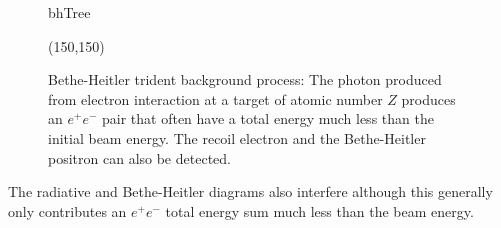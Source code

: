 \begin{figure}[htb]
    \begin{center}
	\begin{fmffile}{bhTree}
	\begin{fmfgraph*}(150,150)
	\fmfstraight
		\fmffreeze
		\fmffreeze	
	\end{fmfgraph*}
	\end{fmffile}
  	\end{center}
    	\caption[Bethe-Heitler background]{Bethe-Heitler trident background process: The photon produced from electron interaction at a target of atomic number $Z$ produces an $e^+e^-$ pair that often have a total energy much less than the initial beam energy. The recoil electron and the Bethe-Heitler positron can also be detected.}
   	 \label{fig:bhTree}	
\end{figure}

The radiative and Bethe-Heitler diagrams also interfere although this generally only contributes an $e^+e^-$ total energy sum much less than the beam energy. 